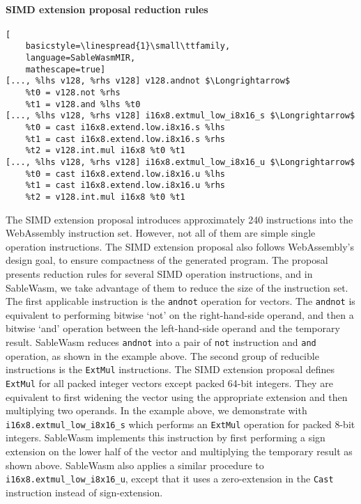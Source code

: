 \paragraph{SIMD extension proposal reduction rules} \quad
\begin{lstlisting}[
    basicstyle=\linespread{1}\small\ttfamily, 
    language=SableWasmMIR, 
    mathescape=true]
[..., %lhs v128, %rhs v128] v128.andnot $\Longrightarrow$
    %t0 = v128.not %rhs 
    %t1 = v128.and %lhs %t0
[..., %lhs v128, %rhs v128] i16x8.extmul_low_i8x16_s $\Longrightarrow$
    %t0 = cast i16x8.extend.low.i8x16.s %lhs
    %t1 = cast i16x8.extend.low.i8x16.s %rhs
    %t2 = v128.int.mul i16x8 %t0 %t1
[..., %lhs v128, %rhs v128] i16x8.extmul_low_i8x16_u $\Longrightarrow$
    %t0 = cast i16x8.extend.low.i8x16.u %lhs
    %t1 = cast i16x8.extend.low.i8x16.u %rhs
    %t2 = v128.int.mul i16x8 %t0 %t1
\end{lstlisting}
The SIMD extension proposal introduces approximately 240 instructions into the
WebAssembly instruction set. However, not all of them are simple single
operation instructions. The SIMD extension proposal also follows WebAssembly's
design goal, to ensure compactness of the generated program. The proposal
presents reduction rules for several SIMD operation instructions, and in
SableWasm, we take advantage of them to reduce the size of the instruction set.
The first applicable instruction is the \texttt{andnot} operation for vectors.
The \texttt{andnot} is equivalent to performing bitwise `not' on the
right-hand-side operand, and then a bitwise `and' operation between the
left-hand-side operand and the temporary result. SableWasm reduces
\texttt{andnot} into a pair of \texttt{not} instruction and \texttt{and}
operation, as shown in the example above. The second group of reducible
instructions is the \texttt{ExtMul} instructions. The SIMD extension proposal
defines \texttt{ExtMul} for all packed integer vectors except packed 64-bit
integers. They are equivalent to first widening the vector using the appropriate
extension and then multiplying two operands. In the example above, we
demonstrate with \texttt{i16x8.extmul\_low\_i8x16\_s} which performs an
\texttt{ExtMul} operation for packed 8-bit integers. SableWasm implements this
instruction by first performing a sign extension on the lower half of the vector
and multiplying the temporary result as shown above. SableWasm also applies a
similar procedure to \texttt{i16x8.extmul\_low\_i8x16\_u}, except that it uses
a zero-extension in the \texttt{Cast} instruction instead of sign-extension.


